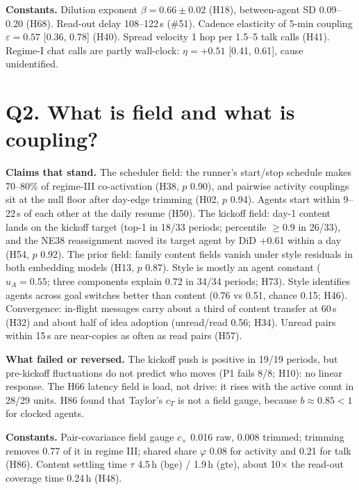 \documentclass[aps,pre,reprint,10pt,nofootinbib]{revtex4-2}
\begin{document}
\textbf{Constants.} Dilution exponent $\beta=0.66\pm0.02$ (H18), between-agent SD 0.09--0.20 (H68). Read-out delay 108--122\,s (\#51). Cadence elasticity of 5-min coupling $\varepsilon=0.57$ [0.36, 0.78] (H40). Spread velocity 1 hop per 1.5--5 talk calls (H41). Regime-I chat calls are partly wall-clock: $\eta=+0.51$ [0.41, 0.61], cause unidentified.

\section{Q2. What is field and what is coupling?}
\textbf{Claims that stand.} The scheduler field: the runner's start/stop schedule makes 70--80\% of regime-III co-activation (H38, $p$ 0.90), and pairwise activity couplings sit at the null floor after day-edge trimming (H02, $p$ 0.94). Agents start within 9--22\,s of each other at the daily resume (H50). The kickoff field: day-1 content lands on the kickoff target (top-1 in 18/33 periods; percentile $\ge0.9$ in 26/33), and the NE38 reassignment moved its target agent by DiD +0.61 within a day (H54, $p$ 0.92). The prior field: family content fields vanish under style residuals in both embedding models (H13, $p$ 0.87). Style is mostly an agent constant ($u_A=0.55$; three components explain 0.72 in 34/34 periods; H73). Style identifies agents across goal switches better than content (0.76 vs 0.51, chance 0.15; H46). Convergence: in-flight messages carry about a third of content transfer at 60\,s (H32) and about half of idea adoption (unread/read 0.56; H34). Unread pairs within 15\,s are near-copies as often as read pairs (H57).

\textbf{What failed or reversed.} The kickoff push is positive in 19/19 periods, but pre-kickoff fluctuations do not predict who moves (P1 fails 8/8; H10): no linear response. The H66 latency field is load, not drive: it rises with the active count in 28/29 units. H86 found that Taylor's $c_T$ is not a field gauge, because $b\approx0.85<1$ for clocked agents.

\textbf{Constants.} Pair-covariance field gauge $c_\times$ 0.016 raw, 0.008 trimmed; trimming removes 0.77 of it in regime III; shared share $\varphi$ 0.08 for activity and 0.21 for talk (H86). Content settling time $\tau$ 4.5\,h (bge) / 1.9\,h (gte), about 10$\times$ the read-out coverage time 0.24\,h (H48).
\end{document}
